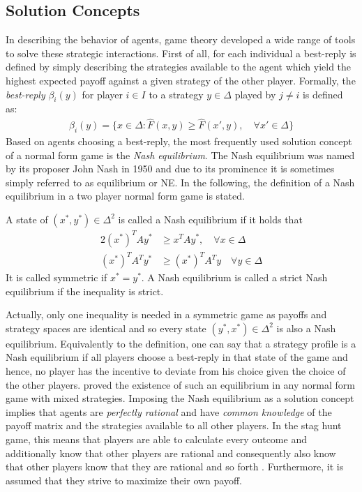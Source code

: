 \subsection{Solution Concepts}
\label{sec:traditionalconcepts}
In describing the behavior of agents, game theory developed a wide range of 
tools to solve these strategic interactions. First of all, for each individual
a best-reply is defined by simply describing the strategies available to the
agent which yield the highest expected payoff against a given 
strategy of the other player.
Formally, the \textit{best-reply} $\beta_i(y)$ for player $i \in I$ to a 
strategy $y \in \Delta$ played by $j \neq i$ is defined as:
\begin{align}
        \label{eq:bestreply}
        \beta_i(y) = \{x \in \Delta: \hat{F}(x,y) \geq \hat{F}(x',y), 
        \quad \forall x' \in \Delta\}
\end{align}
Based on agents choosing a best-reply, the most frequently 
used solution concept of
a normal form game is the \textit{Nash equilibrium}.
The Nash equilibrium was named by its proposer John Nash in 1950 
and due to its prominence it is sometimes simply referred to as equilibrium 
or NE.
In the following, the definition of a Nash equilibrium in a two
player normal form game is stated. 
\begin{mydef}
        \label{def:nashequilibrium}
        A state of $(x^*,y^*) \in \Delta^2$ is called a Nash equilibrium if 
        it holds that
        \begin{alignat*}{2}
                (x^*)^T A y^* &\geq x^T A y^*, \quad \forall x \in \Delta  \\
                (x^*)^T A^T y^* &\geq (x^*)^T A^T y \quad \forall y \in \Delta
        \end{alignat*}
It is called symmetric if $x^* = y^*$. A Nash equilibrium is called a 
strict Nash equilibrium if the inequality is strict.
\end{mydef}
Actually, only one inequality is needed in a symmetric game as payoffs
and strategy spaces are identical and so every state $(y^*,x^*) \in \Delta^2$ 
is also a Nash equilibrium.
Equivalently to the definition, one can say that a strategy profile 
is a Nash equilibrium if all players choose a best-reply in that state of 
the game and hence, no player has the incentive to deviate from his 
choice given the choice of the other players.
\textcite{nash_equilibrium_1950} proved the existence of such 
an equilibrium in any normal form game with mixed strategies. 
Imposing the Nash equilibrium as a solution concept implies that 
agents are \textit{perfectly rational} and have \textit{common knowledge} 
of the payoff matrix and the strategies available to all other players. 
In the stag hunt game, this means that players are able to calculate every
outcome and additionally know that other players are rational and 
consequently also know that other players know that 
they are rational and so forth \parencite{fudenberg_theory_1998}. 
Furthermore, it is assumed that they strive to maximize their own payoff.

